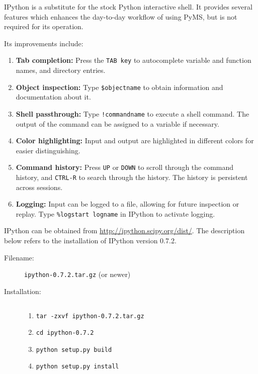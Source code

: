 IPython is a substitute for the stock Python interactive shell. It
provides several features which enhances the day-to-day workflow of
using PyMS, but is not required for its operation.

Its improvements include:
\begin{enumerate}
    \item {\bf Tab completion:} Press the {\tt TAB key} to autocomplete
          variable and function names, and directory entries.
    \item {\bf Object inspection:} Type {\tt \$objectname} to obtain
          information and documentation about it.
    \item {\bf Shell passthrough:} Type {\tt !commandname} to execute a
          shell command. The output of the command can be assigned to a
          variable if necessary.
    \item {\bf Color highlighting:} Input and output are highlighted in
          different colors for easier distinguishing.
    \item {\bf Command history:} Press {\tt UP} or {\tt DOWN} to scroll through the
          command history, and {\tt CTRL-R} to search through the history. The
          history is persistent across sessions.
    \item {\bf Logging:} Input can be logged to a file, allowing for
          future inspection or replay. Type {\tt \%logstart logname}
          in IPython to activate logging.
\end{enumerate}

IPython can be obtained from \url{http://ipython.scipy.org/dist/}. The
description below refers to the installation of IPython version 0.7.2.

\begin{description}
\item [Filename:] {\tt ipython-0.7.2.tar.gz} (or newer)
\item [Installation:] $ $
  \begin{enumerate}
  \item {\tt tar -zxvf ipython-0.7.2.tar.gz}
  \item {\tt cd ipython-0.7.2}
  \item {\tt python setup.py build}
  \item {\tt python setup.py install}
  \end{enumerate}
\end{description}


